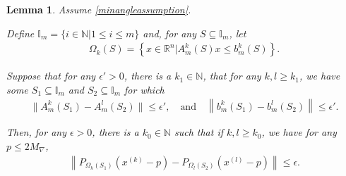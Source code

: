 \documentclass{article}
\newtheorem{lemma}[theorem]{Lemma}
\theoremstyle{case}
\newcommand{\maxgrad}{{M_{\nabla}}}
\newcommand{\naturals}{\mathbb N}
\newcommand{\Rn}{\mathbb R^n}
\newcommand{\xk}{{x^{(k)}}}
\begin{document}
\begin{lemma}
\label{rename_2_2}
Assume \cref{minangleassumption}.

Define $\mathbb I_m = \{ i  \in \naturals | 1 \le i \le m \}$
and, for any $S \subseteq \mathbb I_m$, let
\begin{align*}
\Omega_k(S) = \left\{x\in\Rn | A^k_m\left(S\right) x \le b^k_m\left(S\right)\right\}.
\end{align*}

Suppose that for any $\epsilon' > 0$, there is a $k_1\in\naturals$, that for any $k, l \ge k_1$,
we have some
$S_1 \subseteq \mathbb I_m$ and $S_2 \subseteq \mathbb I_m$
for which
\begin{align*}
\|A^k_m\left(S_1\right) - A^l_m\left(S_2\right)\| \le \epsilon', \quad \textrm{and} \quad \left\|b^k_m\left(S_1\right) - b^l_m\left(S_2\right) \right\| \le \epsilon'.
\end{align*}


Then, for any $\epsilon > 0$, there is a $k_0\in\naturals$ such that if $k, l \ge k_0$, we have for any $p \le 2\maxgrad$,
\begin{align*}
\left\| 
  P_{\Omega_k(S_1)}\left(\xk - p\right) - P_{\Omega_l(S_2)}\left(x^{(l)} - p \right)
\right\| \le \epsilon.
\end{align*}

\end{lemma}
\end{document}
